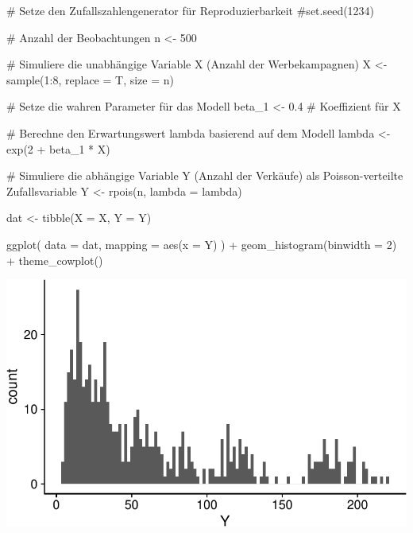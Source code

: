 \documentclass[
  a4paper,
  DIV=11,
  oneside]{scrreprt}
\newenvironment{Shaded}{\begin{snugshade}}{\end{snugshade}}
\newcommand{\AttributeTok}[1]{\textcolor[rgb]{0.40,0.45,0.13}{#1}}
\newcommand{\CommentTok}[1]{\textcolor[rgb]{0.37,0.37,0.37}{#1}}
\newcommand{\DecValTok}[1]{\textcolor[rgb]{0.68,0.00,0.00}{#1}}
\newcommand{\FloatTok}[1]{\textcolor[rgb]{0.68,0.00,0.00}{#1}}
\newcommand{\FunctionTok}[1]{\textcolor[rgb]{0.28,0.35,0.67}{#1}}
\newcommand{\NormalTok}[1]{\textcolor[rgb]{0.00,0.23,0.31}{#1}}
\newcommand{\OtherTok}[1]{\textcolor[rgb]{0.00,0.23,0.31}{#1}}
\newcommand{\SpecialCharTok}[1]{\textcolor[rgb]{0.37,0.37,0.37}{#1}}
\begin{document}
\begin{Shaded}
\begin{Highlighting}[]
\CommentTok{\# Setze den Zufallszahlengenerator für Reproduzierbarkeit}
\CommentTok{\#set.seed(1234)}

\CommentTok{\# Anzahl der Beobachtungen}
\NormalTok{n }\OtherTok{\textless{}{-}} \DecValTok{500}

\CommentTok{\# Simuliere die unabhängige Variable X (Anzahl der Werbekampagnen)}
\NormalTok{X }\OtherTok{\textless{}{-}} \FunctionTok{sample}\NormalTok{(}\DecValTok{1}\SpecialCharTok{:}\DecValTok{8}\NormalTok{, }\AttributeTok{replace =}\NormalTok{ T, }\AttributeTok{size =}\NormalTok{ n)}

\CommentTok{\# Setze die wahren Parameter für das Modell}
\NormalTok{beta\_1 }\OtherTok{\textless{}{-}} \FloatTok{0.4}  \CommentTok{\# Koeffizient für X}

\CommentTok{\# Berechne den Erwartungswert lambda basierend auf dem Modell}
\NormalTok{lambda }\OtherTok{\textless{}{-}} \FunctionTok{exp}\NormalTok{(}\DecValTok{2} \SpecialCharTok{+}\NormalTok{ beta\_1 }\SpecialCharTok{*}\NormalTok{ X)}

\CommentTok{\# Simuliere die abhängige Variable Y (Anzahl der Verkäufe) als Poisson{-}verteilte Zufallsvariable}
\NormalTok{Y }\OtherTok{\textless{}{-}} \FunctionTok{rpois}\NormalTok{(n, }\AttributeTok{lambda =}\NormalTok{ lambda)}

\NormalTok{dat }\OtherTok{\textless{}{-}} \FunctionTok{tibble}\NormalTok{(}\AttributeTok{X =}\NormalTok{ X, }\AttributeTok{Y =}\NormalTok{ Y)}
\end{Highlighting}
\end{Shaded}

\begin{Shaded}
\begin{Highlighting}[]
\FunctionTok{ggplot}\NormalTok{(}
  \AttributeTok{data =}\NormalTok{ dat, }
  \AttributeTok{mapping =} \FunctionTok{aes}\NormalTok{(}\AttributeTok{x =}\NormalTok{ Y)}
\NormalTok{  ) }\SpecialCharTok{+}
  \FunctionTok{geom\_histogram}\NormalTok{(}\AttributeTok{binwidth =} \DecValTok{2}\NormalTok{) }\SpecialCharTok{+}
  \FunctionTok{theme\_cowplot}\NormalTok{()}
\end{Highlighting}
\end{Shaded}

\includegraphics{Reg_files/figure-pdf/unnamed-chunk-14-1.pdf}
\end{document}
